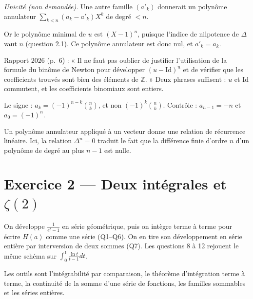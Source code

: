 \documentclass[11pt,a4paper]{article}
\begin{document}
\emph{Unicité (non demandée).} Une autre famille \((a'_k)\) donnerait un polynôme annulateur \(\sum_{k<n}(a_k-a'_k)X^k\) de degré \(<n\).

Or le polynôme minimal de \(u\) est \((X-1)^n\), puisque l'indice de nilpotence de \(\Delta\) vaut \(n\) (question 2.1). Ce polynôme annulateur est donc nul, et \(a'_k=a_k\).

\begin{jury}

Rapport 2026 (p.~6) : « Il ne faut pas oublier de justifier l'utilisation de la formule du binôme de Newton pour développer \((u-\mathrm{Id})^n\) et de vérifier que les coefficients trouvés sont bien des éléments de \(\mathbb Z\). » Deux phrases suffisent : \(u\) et \(\mathrm{Id}\) commutent, et les coefficients binomiaux sont entiers.

\end{jury}

\begin{piege}

Le signe : \(a_k=(-1)^{n-k}\binom nk\), et non \((-1)^k\binom nk\). Contrôle : \(a_{n-1}=-n\) et \(a_0=(-1)^n\).

\end{piege}

\begin{methode}

Un polynôme annulateur appliqué à un vecteur donne une relation de récurrence linéaire. Ici, la relation \(\Delta^n=0\) traduit le fait que la différence finie d'ordre \(n\) d'un polynôme de degré au plus \(n-1\) est nulle.

\end{methode}

\hypertarget{exercice-2-deux-intuxe9grales-et-zeta2}{%
\section{\texorpdfstring{Exercice 2 --- Deux intégrales et \(\zeta(2)\)}{Exercice 2 --- Deux intégrales et \textbackslash zeta(2)}}\label{exercice-2-deux-intuxe9grales-et-zeta2}}

On développe \(\frac1{e^t-1}\) en série géométrique, puis on intègre terme à terme pour écrire \(H(a)\) comme une série (Q1--Q6). On en tire son développement en série entière par interversion de deux sommes (Q7). Les questions 8 à 12 rejouent le même schéma sur \(\int_0^1\frac{\ln t}{t-1}dt\).

Les outils sont l'intégrabilité par comparaison, le théorème d'intégration terme à terme, la continuité de la somme d'une série de fonctions, les familles sommables et les séries entières.
\end{document}

